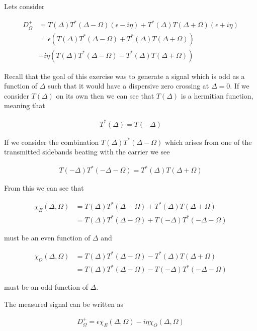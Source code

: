 \documentclass[12pt]{article}
\newcommand{\ep}{\epsilon}
\begin{document}
Lets consider

\begin{align}
D_{\Omega}^+ &= T(\Delta)T^*(\Delta-\Omega)(\ep-i\eta) + T^*(\Delta)T(\Delta+\Omega)(\ep+i\eta)\\
&= \ep\left(T(\Delta)T^*(\Delta-\Omega) + T^*(\Delta)T(\Delta+\Omega)\right)\\
&- i\eta\left(T(\Delta)T^*(\Delta-\Omega) - T^*(\Delta)T(\Delta+\Omega)\right)
\end{align}

Recall that the goal of this exercise was to generate a signal which is odd as a function of $\Delta$ such that it would have a dispersive zero crossing at $\Delta=0$. If we consider $T(\Delta)$ on its own then we can see that $T(\Delta)$ is a hermitian function, meaning that

\begin{align}
T^*(\Delta) = T(-\Delta)
\end{align}

If we consider the combination $T(\Delta)T^*(\Delta-\Omega)$ which arises from one of the transmitted sidebands beating with the carrier we see

\begin{align}
T(-\Delta)T^*(-\Delta-\Omega) = T^*(\Delta)T(\Delta+\Omega)
\end{align}

From this we can see that

\begin{align}
\chi_E(\Delta,\Omega) &= T(\Delta)T^*(\Delta-\Omega) + T^*(\Delta)T(\Delta+\Omega)\\ 
&= T(\Delta)T^*(\Delta-\Omega) + T(-\Delta)T^*(-\Delta - \Omega)
\end{align}

must be an even function of $\Delta$ and

\begin{align}
\chi_O(\Delta, \Omega) &= T(\Delta)T^*(\Delta-\Omega) - T^*(\Delta)T(\Delta+\Omega)\\
& = T(\Delta)T^*(\Delta-\Omega) - T(-\Delta)T^*(-\Delta - \Omega)
\end{align}

must be an odd function of $\Delta$.

The measured signal can be written as

\begin{align}
D_{\Omega}^+ = \ep \chi_E(\Delta, \Omega) - i\eta \chi_O(\Delta, \Omega)
\end{align}
\end{document}
